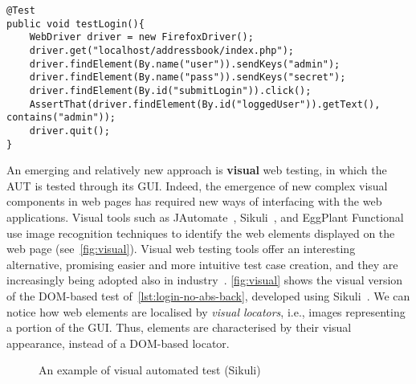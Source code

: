 \begin{lstlisting}[firstnumber=1, xrightmargin=6ex, float=t,numbers=right,caption={An example of programmable automated test (Selenium WebDriver)},label=lst:login-no-abs-back]
@Test
public void testLogin(){
	WebDriver driver = new FirefoxDriver();
	driver.get("localhost/addressbook/index.php");
	driver.findElement(By.name("user")).sendKeys("admin");
	driver.findElement(By.name("pass")).sendKeys("secret");
	driver.findElement(By.id("submitLogin")).click();
	AssertThat(driver.findElement(By.id("loggedUser")).getText(), contains("admin"));
	driver.quit();
}
\end{lstlisting}

An emerging and relatively new approach is \textbf{visual} web testing, in which the AUT is tested through its GUI. Indeed, the emergence of new complex visual components in web pages has required new ways of interfacing with the web applications. Visual tools such as JAutomate~\cite{Alegroth2013jat}, Sikuli~\cite{Sikuli}, and EggPlant Functional~\cite{eggplant} use image recognition techniques to identify the web elements displayed on the web page (see~\autoref{fig:visual}). Visual web testing tools offer an interesting alternative, promising easier and more intuitive test case creation, and they are increasingly being adopted also in industry~\cite{Alegroth2013jat}. 
\autoref{fig:visual} shows the visual version of the DOM-based test of~\autoref{lst:login-no-abs-back}, developed using Sikuli~\cite{Sikuli}. We can notice how web elements are localised by \textit{visual locators}, i.e., images representing a portion of the GUI. Thus, elements are characterised by their visual appearance, instead of a DOM-based locator.

\begin{figure}[b]
\centering
{}
\caption{An example of visual automated test (Sikuli)}
\label{fig:visual}
\end{figure}

